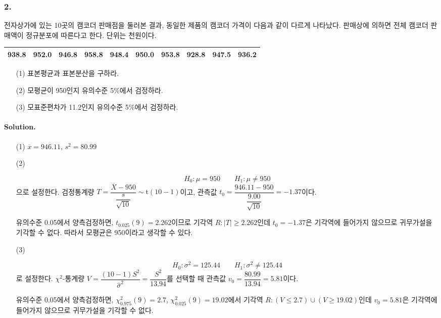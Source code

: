 \subsubsection{2.} 전자상가에 있는 10곳의 캠코더 판매점을 둘러본 결과, 동일한 제품의 캠코더 가격이 다음과 같이 다르게 나타났다.
판매상에 의하면 전체 캠코더 판매액이 정규분포에 따른다고 한다. 단위는 천원이다.

\begin{center}
    \begin{tabular}{cccccccccc}
        \hline
        938.8 & 952.0 & 946.8 & 958.8 & 948.4 & 950.0 & 953.8 & 928.8 & 947.5 & 936.2 \\
        \hline
    \end{tabular}
\end{center}

\begin{itemize}
    \item[(1)] 표본평균과 표본분산을 구하라.
    \item[(2)] 모평균이 950인지 유의수준 5\%에서 검정하라.
    \item[(3)] 모표준편차가 11.2인지 유의수준 5\%에서 검정하라.  
\end{itemize}

\paragraph{Solution.}

\begin{itemize}
    \item[(1)] {
        $\overline{x}=946.11$, $s^2=80.99$
    }
    \item[(2)] {
        \[H_0:\mu=950 \qquad H_1:\mu\neq950\]
        으로 설정한다. 검정통계량 $T=\dfrac{\overline{X}-950}{\dfrac{s}{\sqrt{10}}}\sim\mathrm{t}\left(10-1\right)$이고,
        관측값 $t_0=\dfrac{946.11-950}{\dfrac{9.00}{\sqrt{10}}}=-1.37$이다.

        유의수준 0.05에서 양측검정하면, $t_{0.025}\left(9\right)=2.262$이므로 기각역 $R:\left|T\right|\geq 2.262$인데
        $t_0=-1.37$은 기각역에 들어가지 않으므로 귀무가설을 기각할 수 없다. 따라서 모평균은 950이라고 생각할 수 있다.
    }
    \item[(3)] {
        \[H_0:\sigma^2=125.44 \qquad H_1:\sigma^2\neq125.44\]
        로 설정한다. $\chi^2$-통계량 $V=\dfrac{\left(10-1\right)S^2}{\hat{\sigma}^2}=\dfrac{S^2}{13.94}$를 선택할 때
        관측값 $v_0=\dfrac{80.99}{13.94}=5.81$이다.

        유의수준 0.05에서 양측검정하면, $\chi^2_{0.975}\left(9\right)=2.7$, $\chi^2_{0.025}\left(9\right)=19.02$에서
        기각역 $R:\left(V\leq 2.7\right) \cup \left(V\geq 19.02\right)$인데 $v_0=5.81$은 기각역에 들어가지 않으므로 귀무가설을 기각할 수 없다.
    }
\end{itemize}

